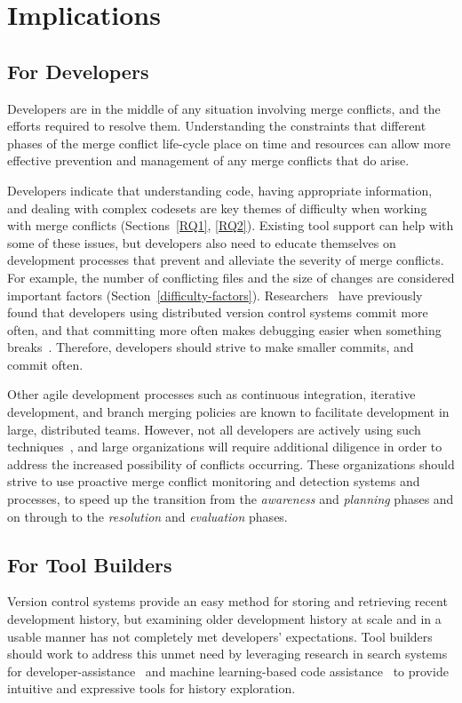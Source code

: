 \section{Implications}\label{implications}

\subsection{For Developers}
Developers are in the middle of any situation involving merge conflicts, and the efforts required to resolve them.
Understanding the constraints that different phases of the merge conflict life-cycle place on time and resources can allow more effective prevention and management of any merge conflicts that do arise.

Developers indicate that understanding code, having appropriate information, and dealing with complex codesets are key themes of difficulty when working with merge conflicts (Sections~\ref{RQ1}, \ref{RQ2}).
Existing tool support can help with some of these issues, but developers also need to educate themselves on development processes that prevent and alleviate the severity of merge conflicts. 
For example, the number of conflicting files and the size of changes are considered important factors (Section~\ref{difficulty-factors}).
Researchers~\cite{brindescu2014versioncontrol} have previously found that developers using distributed version control systems commit more often, and that committing more often makes debugging easier when something breaks~\cite{meyer2014continuous}.
Therefore, developers should strive to make smaller commits, and commit often.

Other agile development processes such as continuous integration, iterative development, and branch merging policies are known to facilitate development in large, distributed teams. 
However, not all developers are actively using such techniques~\cite{phillips2011branching}, and large organizations will require additional diligence in order to address the increased possibility of conflicts occurring.
These organizations should strive to use proactive merge conflict monitoring and detection systems and processes, to speed up the transition from the \textit{awareness} and \textit{planning} phases and on through to the \textit{resolution} and \textit{evaluation} phases.

\subsection{For Tool Builders}
Version control systems provide an easy method for storing and retrieving recent development history, but examining older development history at scale and in a usable manner has not completely met developers' expectations.
Tool builders should work to address this unmet need by leveraging research in search systems for developer-assistance~\cite{nabi2016putting} and machine learning-based code assistance~\cite{bradley2011history_exploration} to provide intuitive and expressive tools for history exploration.

